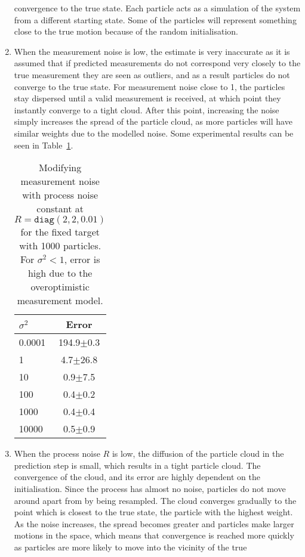 \documentclass[a4paper,12pt]{article}
\begin{document}
\begin{enumerate}
  convergence to the true state. Each particle acts as a simulation of the
  system from a different starting state. Some of the particles will represent
  something close to the true motion because of the random initialisation.
\item When the measurement noise is low, the estimate is very inaccurate as it
  is assumed that if predicted measurements do not correspond very closely to
  the true measurement they are seen as outliers, and as a result particles do
  not converge to the true state. For measurement noise close to 1, the
  particles stay dispersed until a valid measurement is received, at which point
  they instantly converge to a tight cloud. After this point, increasing the
  noise simply increases the spread of the particle cloud, as more particles
  will have similar weights due to the modelled noise. Some experimental results
  can be seen in Table~\ref{tab:fixt}.
  \begin{table}
    \centering
    \begin{tabular}{lc}
      $\sigma^2$ & Error         \\\hline
      0.0001 & 194.9$\pm$0.3 \\
      1 & 4.7$\pm$26.8  \\
      10 & 0.9$\pm$7.5   \\
      100 & 0.4$\pm$0.2   \\
      1000 & 0.4$\pm$0.4   \\
      10000 & 0.5$\pm$0.9   \\
    \end{tabular}
    \caption{Modifying measurement noise with process noise constant at
      $R=\texttt{diag}(2,2,0.01)$ for the fixed target with 1000 particles. For $\sigma^2<1$, error
      is high due to the overoptimistic measurement model.}
    \label{tab:fixt}
  \end{table}
\item When the process noise $R$ is low, the diffusion of the particle cloud in
  the prediction step is small, which results in a tight particle cloud. The
  convergence of the cloud, and its error are highly dependent on the
  initialisation. Since the process has almost no noise, particles do not move
  around apart from by being resampled. The cloud converges gradually to the
  point which is closest to the true state, the particle with the highest
  weight. As the noise increases, the spread becomes greater and particles make
  larger motions in the space, which means that convergence is reached more
  quickly as particles are more likely to move into the vicinity of the true

\end{enumerate}
\end{document}
